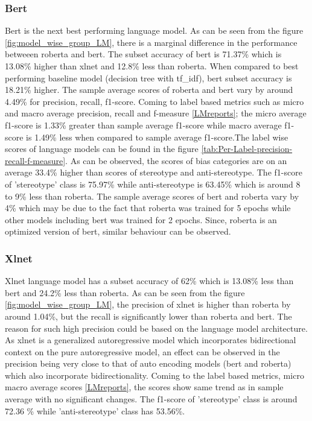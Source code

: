 \subsubsection{Bert}
Bert is the next best performing language model. As can be seen from the figure \ref{fig:model_wise_group_LM}, there is a marginal difference in the performance betweeen roberta and bert. The subset accuracy of bert is 71.37\% which is 13.08\% higher than xlnet and 12.8\% less than roberta. When compared to best performing baseline model (decision tree with tf\_idf), bert subset accuracy is 18.21\% higher. The sample average scores of roberta and bert vary by around 4.49\% for precision, recall, f1-score. Coming to label based metrics such as micro and macro average precision, recall and f-measure \ref{LMreports}; the micro  average f1-score is 1.33\% greater than sample average f1-score while macro average f1-score is 1.49\% less when compared to sample average f1-score.The label wise scores of language models can be found in the figure \ref{tab:Per-Label-precision-recall-f-measure}. As can be observed, the scores of bias categories are on an average 33.4\% higher than scores of stereotype and anti-stereotype. The f1-score of 'stereotype' class is 75.97\% while anti-stereotype is 63.45\% which is around 8 to 9\% less than roberta. The sample average scores of bert and roberta vary by 4\% which may be due to the fact that roberta was trained for 5 epochs while other models including bert was trained for 2 epochs. Since, roberta is an optimized version of bert, similar behaviour can be observed.

\subsubsection{Xlnet}
Xlnet language model has a subset accuracy of 62\% which is 13.08\% less than bert and 24.2\% less than roberta. As can be seen from the figure \ref{fig:model_wise_group_LM}, the precision of xlnet is higher than roberta by around 1.04\%, but the recall is significantly lower than roberta and bert. The reason for such high precision could be based on the language model architecture. As xlnet is a generalized autoregressive model which incorporates bidirectional context on the pure autoregressive model, an effect can be observed in the precision being very close to that of auto encoding models (bert and roberta) which also incorporate bidirectionality.  Coming to the label based metrics, micro macro average scores \ref{LMreports}, the scores show same trend as in sample average with no significant changes. The f1-score of 'stereotype' class is around 72.36 \% while 'anti-stereotype' class has 53.56\%.

